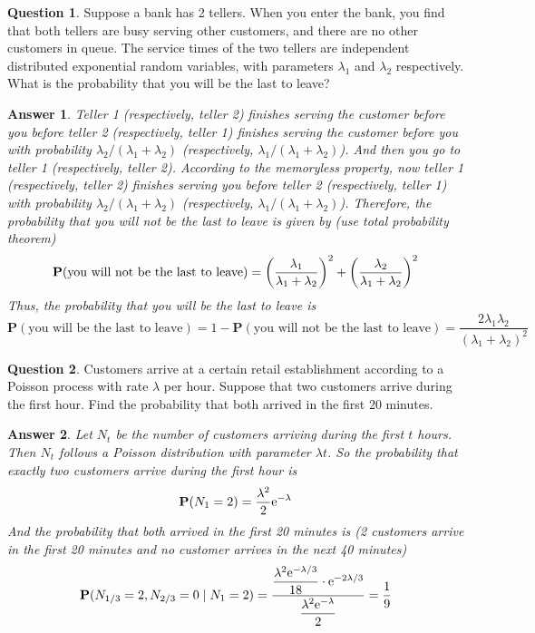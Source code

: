 \documentclass[utf8]{article}
\theoremstyle{definition}%
\newtheorem{question}{Question} %
\theoremstyle{plain}%
\newtheorem{answer}{Answer} %
\begin{document}
\begin{question}
    Suppose a bank has 2 tellers. When you enter the bank, you find that both tellers are busy serving other customers, and there are no other customers in queue. The service times of the two tellers are independent distributed exponential random variables, with parameters $\lambda_1$ and $\lambda_2$ respectively. What is the probability that you will be the last to leave?
\end{question}
\begin{answer}
    Teller 1 (respectively, teller 2) finishes serving the customer before you before teller 2 (respectively, teller 1) finishes serving the customer before you with probability $\lambda_2 / (\lambda_1 + \lambda_2)$ (respectively, $\lambda_1 / (\lambda_1 + \lambda_2)$). And then you go to teller 1 (respectively, teller 2). According to the memoryless property, now teller 1 (respectively, teller 2) finishes serving you before teller 2 (respectively, teller 1) with probability $\lambda_2 / (\lambda_1 + \lambda_2)$ (respectively, $\lambda_1 / (\lambda_1 + \lambda_2)$). Therefore, the probability that you will not be the last to leave is given by (use total probability theorem)
    \begin{equation}
        \mathbf{P}(\text{you will not be the last to leave}) = \qty(\frac{\lambda_1}{\lambda_1 + \lambda_2})^2 + \qty(\frac{\lambda_2}{\lambda_1 + \lambda_2})^2
    \end{equation}
    Thus, the probability that you will be the last to leave is
    \begin{equation}
        \mathbf{P}(\text{you will be the last to leave}) = 1 - \mathbf{P}(\text{you will not be the last to leave}) = \frac{2 \lambda_1 \lambda_2}{(\lambda_1 + \lambda_2)^2}
    \end{equation}
\end{answer}

\begin{question}
    Customers arrive at a certain retail establishment according to a Poisson process with rate $\lambda$ per hour. Suppose that two customers arrive during the first hour. Find the probability that both arrived in the first 20 minutes.
\end{question}
\begin{answer}
    Let $N_t$ be the number of customers arriving during the first $t$ hours. Then $N_t$ follows a Poisson distribution with parameter $\lambda t$. So the probability that exactly two customers arrive during the first hour is
    \begin{equation}
        \mathbf{P}(N_1 = 2) = \frac{\lambda^2}{2} \mathrm{e}^{-\lambda}
    \end{equation}
    And the probability that both arrived in the first 20 minutes is (2 customers arrive in the first 20 minutes and no customer arrives in the next 40 minutes)
    \begin{equation}
        \mathbf{P}(N_{1/3} = 2, N_{2/3} = 0 \mid N_1 = 2) = \dfrac{\dfrac{\lambda^2 \mathrm{e}^{-\lambda/3}}{18} \cdot \mathrm{e}^{-2\lambda/3}}{\dfrac{\lambda^2 \mathrm{e}^{-\lambda}}{2}} = \frac{1}{9}
    \end{equation}
\end{answer}
\end{document}
